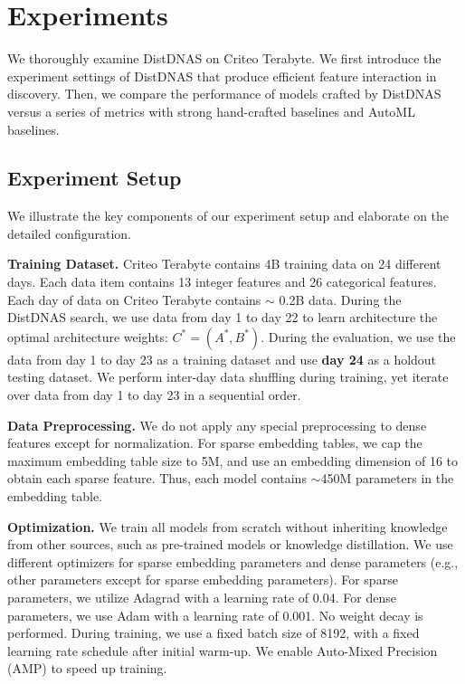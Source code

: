 \section{Experiments}
We thoroughly examine DistDNAS on Criteo Terabyte.
We first introduce the experiment settings of DistDNAS that produce efficient feature interaction in discovery.
Then, we compare the performance of models crafted by DistDNAS versus a series of metrics with strong hand-crafted baselines and AutoML baselines.


\subsection{Experiment Setup} 
We illustrate the key components of our experiment setup and elaborate on the detailed configuration.

\noindent \textbf{Training Dataset.}
Criteo Terabyte contains 4B training data on 24 different days. Each data item contains 13 integer features and 26 categorical features.
Each day of data on Criteo Terabyte contains $\sim$ 0.2B data.
During the DistDNAS search, we use data from day 1 to day 22 to learn architecture the optimal architecture weights: $C^{*}=(A^{*}, B^{*})$. During the evaluation, we use the data from day 1 to day 23 as a training dataset and use \textbf{day 24} as a holdout testing dataset. We perform inter-day data shuffling during training, yet iterate over data from day 1 to day 23 in a sequential order.

\noindent \textbf{Data Preprocessing.} We do not apply any special preprocessing to dense features except for normalization. For sparse embedding tables, we cap the maximum embedding table size to 5M, and use an embedding dimension of 16 to obtain each sparse feature. Thus, each model contains $\sim$450M parameters in the embedding table.

\noindent \textbf{Optimization.} 
We train all models from scratch without inheriting knowledge from other sources, such as pre-trained models or knowledge distillation.
We use different optimizers for sparse embedding parameters and dense parameters (e.g., other parameters except for sparse embedding parameters). For sparse parameters, we utilize Adagrad with a learning rate of 0.04. For dense parameters, we use Adam with a learning rate of 0.001. 
No weight decay is performed.
During training, we use a fixed batch size of 8192, with a fixed learning rate schedule after initial warm-up. We enable Auto-Mixed Precision (AMP) to speed up training.


